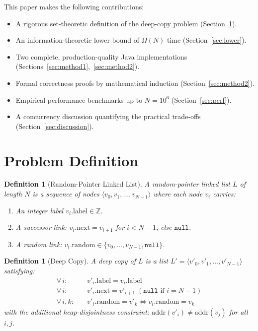 \documentclass[10pt,journal,compsoc]{IEEEtran}
\newtheorem{definition}[theorem]{Definition}
\begin{document}
This paper makes the following contributions:
\begin{itemize}
  \item A rigorous set-theoretic definition of the deep-copy problem (Section~\ref{sec:problem}).
  \item An information-theoretic lower bound of $\Omega(N)$ time (Section~\ref{sec:lower}).
  \item Two complete, production-quality Java implementations (Sections~\ref{sec:method1},~\ref{sec:method2}).
  \item Formal correctness proofs by mathematical induction (Section~\ref{sec:method2}).
  \item Empirical performance benchmarks up to $N=10^6$ (Section~\ref{sec:perf}).
  \item A concurrency discussion quantifying the practical trade-offs (Section~\ref{sec:discussion}).
\end{itemize}

\section{Problem Definition}
\label{sec:problem}

\begin{definition}[Random-Pointer Linked List]
A \emph{random-pointer linked list} $L$ of length $N$ is a sequence of nodes $\langle v_0, v_1, \ldots, v_{N-1} \rangle$ where each node $v_i$ carries:
\begin{enumerate}
  \item An integer label $v_i.\mathrm{label} \in \mathbb{Z}$.
  \item A successor link: $v_i.\mathrm{next} = v_{i+1}$ for $i < N{-}1$, else $\mathtt{null}$.
  \item A random link: $v_i.\mathrm{random} \in \{v_0, \ldots, v_{N-1}, \mathtt{null}\}$.
\end{enumerate}
\end{definition}

\begin{definition}[Deep Copy]
\label{def:deepcopy}
A \emph{deep copy} of $L$ is a list $L' = \langle v'_0, v'_1, \ldots, v'_{N-1} \rangle$ satisfying:
\begin{align}
  \forall\,i: &\quad v'_i.\mathrm{label}  = v_i.\mathrm{label} \label{eq:label} \\
  \forall\,i: &\quad v'_i.\mathrm{next}   = v'_{i+1}\;(\mathtt{null}\text{ if }i=N{-}1) \label{eq:next} \\
  \forall\,i,k: &\quad v'_i.\mathrm{random} = v'_k \iff v_i.\mathrm{random} = v_k \label{eq:random}
\end{align}
with the additional \emph{heap-disjointness} constraint: $\mathrm{addr}(v'_i) \neq \mathrm{addr}(v_j)$ for all $i, j$.
\end{definition}
\end{document}
